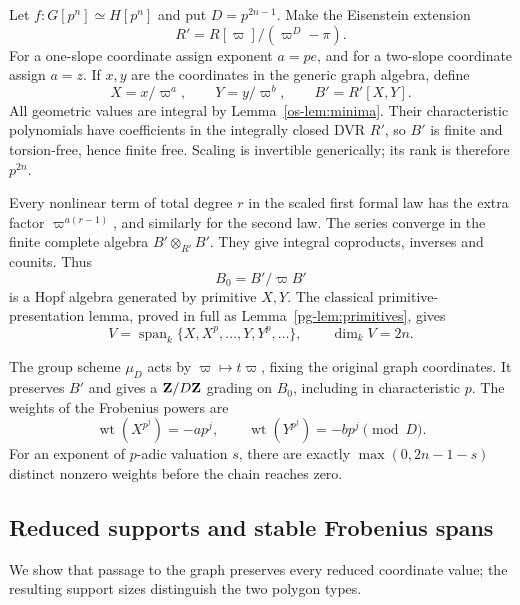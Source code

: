 Let $f:G[p^n]\simeq H[p^n]$ and put $D=p^{2n-1}$. Make the Eisenstein extension
\[
 R'=R[\varpi]/(\varpi^D-\pi).
\]
For a one-slope coordinate assign exponent $a=pe$, and for a two-slope coordinate assign $a=z$. If $x,y$ are the coordinates in the generic graph algebra, define
\[
 X=x/\varpi^a,\qquad Y=y/\varpi^b,\qquad B'=R'[X,Y].
\]
All geometric values are integral by Lemma~\ref{os-lem:minima}. Their characteristic polynomials have coefficients in the integrally closed DVR $R'$, so $B'$ is finite and torsion-free, hence finite free. Scaling is invertible generically; its rank is therefore $p^{2n}$.

Every nonlinear term of total degree $r$ in the scaled first formal law has the extra factor $\varpi^{a(r-1)}$, and similarly for the second law. The series converge in the finite complete algebra $B'\otimes_{R'}B'$. They give integral coproducts, inverses and counits. Thus
\[
 B_0=B'/\varpi B'
\]
is a Hopf algebra generated by primitive $X,Y$. The classical primitive-presentation lemma, proved in full as Lemma~\ref{pg-lem:primitives}, gives
\begin{equation}\label{os-eq:primitive-dimension}
 V=\operatorname{span}_k\{X,X^p,\ldots,Y,Y^p,\ldots\},
 \qquad \dim_k V=2n.
\end{equation}

The group scheme $\mu_D$ acts by $\varpi\mapsto t\varpi$, fixing the original graph coordinates. It preserves $B'$ and gives a $\mathbf Z/D\mathbf Z$ grading on $B_0$, including in characteristic $p$. The weights of the Frobenius powers are
\[
 \operatorname{wt}(X^{p^j})=-ap^j,\qquad
 \operatorname{wt}(Y^{p^j})=-bp^j\pmod D.
\]
For an exponent of $p$-adic valuation $s$, there are exactly $\max(0,2n-1-s)$ distinct nonzero weights before the chain reaches zero.

\subsection{Reduced supports and stable Frobenius spans}
We show that passage to the graph preserves every reduced coordinate value; the resulting support sizes distinguish the two polygon types.

